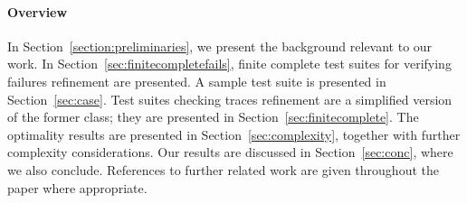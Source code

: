 %
%


\paragraph{Overview} In Section~\ref{section:preliminaries}, we present the
background relevant to our work. In Section~\ref{sec:finitecompletefails},
finite complete test suites for verifying failures refinement are presented.
A sample test suite is presented in Section~\ref{sec:case}. Test suites
checking traces refinement are a simplified version of the former class; they
are presented in Section~\ref{sec:finitecomplete}. The optimality results are
presented in Section~\ref{sec:complexity}, together with further complexity
considerations. Our results are discussed in Section~\ref{sec:conc}, where we
also conclude. References to further related work are given throughout the
paper where appropriate.

